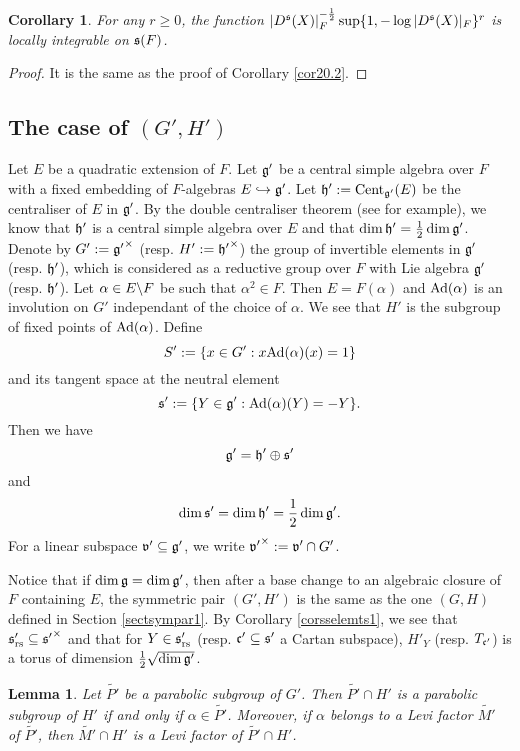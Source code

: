 \documentclass[a4paper]{amsart}
\newcommand{\wt}{\widetilde}                        \newcommand{\wh}{\widehat}                      \newcommand{\wpair}[1]{\left\{{#1}\right\}}
\newtheorem{coro}[thm]{Corollary}
\newtheorem{lem}[thm]{Lemma}
\theoremstyle{definition}
\theoremstyle{remark}
\numberwithin{equation}{subsection}
\begin{document}
\begin{coro}\label{corII.1}
For any $r\geq0$, the function $|D^{\mathfrak{s}}(X)|_F^{-\frac{1}{2}}\sup\{1, -\log |D^{\mathfrak{s}}(X)|_F\}^r$ is locally integrable on ${\mathfrak{s}}(F)$. 
\end{coro}

\begin{proof}
It is the same as the proof of Corollary \ref{cor20.2}. 
\end{proof}

\subsection{The case of $(G',H')$}\label{sectsympar2}

Let $E$ be a quadratic extension of $F$. Let ${\mathfrak{g}}'$ be a central simple algebra over $F$ with a fixed embedding of $F$-algebras $E\hookrightarrow{\mathfrak{g}}'$. Let ${\mathfrak{h}}':={\mathrm{Cent}}_{{\mathfrak{g}}'}(E)$ be the centraliser of $E$ in ${\mathfrak{g}}'$. By the double centraliser theorem (see \cite[Theorem 3.1 in Chapter IV]{milneCFT} for example), we know that ${\mathfrak{h}}'$ is a central simple algebra over $E$ and that $\dim{\mathfrak{h}}'=\frac{1}{2}\dim{\mathfrak{g}}'$. Denote by $G':={{\mathfrak{g}}'}^\times$ (resp. $H':={{\mathfrak{h}}'}^\times$) the group of invertible elements in ${\mathfrak{g}}'$ (resp. ${\mathfrak{h}}'$), which is considered as a reductive group over $F$ with Lie algebra ${\mathfrak{g}}'$ (resp. ${\mathfrak{h}}'$). Let $\alpha\in E\backslash F$ be such that $\alpha^2\in F$. Then $E=F(\alpha)$ and ${\mathrm{Ad}}(\alpha)$ is an involution on $G'$ independant of the choice of $\alpha$. We see that $H'$ is the subgroup of fixed points of ${\mathrm{Ad}}(\alpha)$. Define 
$$ S':=\{x\in G': x{\mathrm{Ad}}(\alpha)(x)=1\} $$
and its tangent space at the neutral element 
$$ {\mathfrak{s}}':=\{Y\in{\mathfrak{g}}': {\mathrm{Ad}}(\alpha)(Y)=-Y\}. $$
Then we have 
$$ {\mathfrak{g}}'={\mathfrak{h}}'\oplus{\mathfrak{s}}' $$ 
and 
$$ \dim{\mathfrak{s}}'=\dim{\mathfrak{h}}'=\frac{1}{2}\dim{\mathfrak{g}}'. $$ 
For a linear subspace ${\mathfrak{v}}'\subseteq{\mathfrak{g}}'$, we write ${{\mathfrak{v}}'}^\times:={\mathfrak{v}}'\cap G'$. 

Notice that if $\dim{\mathfrak{g}}=\dim{\mathfrak{g}}'$, then after a base change to an algebraic closure of $F$ containing $E$, the symmetric pair $(G',H')$ is the same as the one $(G,H)$ defined in Section \ref{sectsympar1}. By Corollary \ref{corsselemts1}, we see that ${\mathfrak{s}}'_{\mathrm{rs}}\subseteq{{\mathfrak{s}}'}^\times$ and that for $Y\in{\mathfrak{s}}'_{\mathrm{rs}}$ (resp. ${\mathfrak{c}}'\subseteq{\mathfrak{s}}'$ a Cartan subspace), $H'_Y$ (resp. $T_{{\mathfrak{c}}'}$) is a torus of dimension $\frac{1}{2}\sqrt{\dim{\mathfrak{g}}'}$. 

\begin{lem}\label{intpar2}
Let $\wt{P'}$ be a parabolic subgroup of $G'$. Then $\wt{P'}\cap H'$ is a parabolic subgroup of $H'$ if and only if $\alpha\in \wt{P'}$. Moreover, if $\alpha$ belongs to a Levi factor $\wt{M'}$ of $\wt{P'}$, then $\wt{M'}\cap H'$ is a Levi factor of $\wt{P'}\cap H'$. 
\end{lem}
\end{document}
